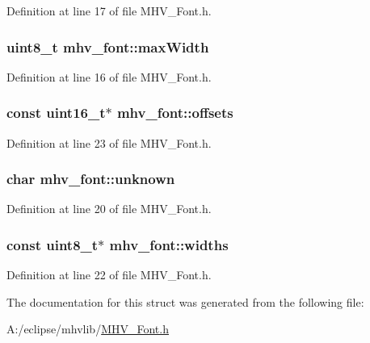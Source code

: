 Definition at line 17 of file M\-H\-V\-\_\-\-Font.\-h.

\hypertarget{structmhv__font_a21edb005a94690dc33615312f21640d0}{
\subsubsection[{max\-Width}]{\setlength{\rightskip}{0pt plus 5cm}uint8\-\_\-t mhv\-\_\-font\-::max\-Width}}\label{structmhv__font_a21edb005a94690dc33615312f21640d0}


Definition at line 16 of file M\-H\-V\-\_\-\-Font.\-h.

\hypertarget{structmhv__font_abf40bd8aecc79834ae9a010a25de1ecd}{
\subsubsection[{offsets}]{\setlength{\rightskip}{0pt plus 5cm}const uint16\-\_\-t$\ast$ mhv\-\_\-font\-::offsets}}\label{structmhv__font_abf40bd8aecc79834ae9a010a25de1ecd}


Definition at line 23 of file M\-H\-V\-\_\-\-Font.\-h.

\hypertarget{structmhv__font_a2df18aa9aae6fbbd346b07084eb7f5af}{
\subsubsection[{unknown}]{\setlength{\rightskip}{0pt plus 5cm}char mhv\-\_\-font\-::unknown}}\label{structmhv__font_a2df18aa9aae6fbbd346b07084eb7f5af}


Definition at line 20 of file M\-H\-V\-\_\-\-Font.\-h.

\hypertarget{structmhv__font_a27b1d6f8273b5c47331c56dc2fa99d39}{
\subsubsection[{widths}]{\setlength{\rightskip}{0pt plus 5cm}const uint8\-\_\-t$\ast$ mhv\-\_\-font\-::widths}}\label{structmhv__font_a27b1d6f8273b5c47331c56dc2fa99d39}


Definition at line 22 of file M\-H\-V\-\_\-\-Font.\-h.



The documentation for this struct was generated from the following file\-:\begin{DoxyCompactItemize}
\item 
A\-:/eclipse/mhvlib/\hyperlink{_m_h_v___font_8h}{M\-H\-V\-\_\-\-Font.\-h}\end{DoxyCompactItemize}
